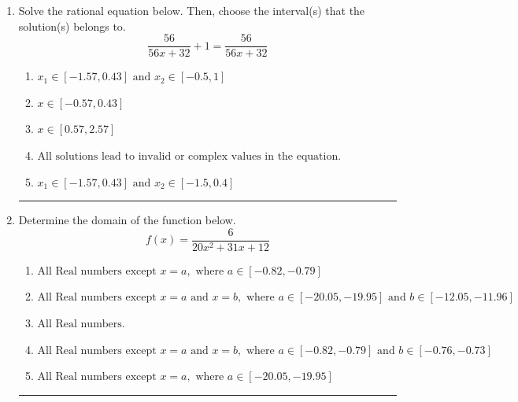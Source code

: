 \documentclass[14pt]{extbook}
\newcommand{\litem}[1]{\item#1\hspace*{-1cm}\rule{\textwidth}{0.4pt}}
\begin{document}
\begin{enumerate}
{\begin{enumerate}[label=\Alph*.]
\end{enumerate} }
\litem{
Solve the rational equation below. Then, choose the interval(s) that the solution(s) belongs to.\[ \frac{56}{56x + 32} + 1 = \frac{56}{56x + 32} \]\begin{enumerate}[label=\Alph*.]
\item \( x_1 \in [-1.57, 0.43] \text{ and } x_2 \in [-0.5,1] \)
\item \( x \in [-0.57,0.43] \)
\item \( x \in [0.57,2.57] \)
\item \( \text{All solutions lead to invalid or complex values in the equation.} \)
\item \( x_1 \in [-1.57, 0.43] \text{ and } x_2 \in [-1.5,0.4] \)

\end{enumerate} }
\litem{
Determine the domain of the function below.\[ f(x) = \frac{6}{20x^{2} +31 x + 12} \]\begin{enumerate}[label=\Alph*.]
\item \( \text{All Real numbers except } x = a, \text{ where } a \in [-0.82, -0.79] \)
\item \( \text{All Real numbers except } x = a \text{ and } x = b, \text{ where } a \in [-20.05, -19.95] \text{ and } b \in [-12.05, -11.96] \)
\item \( \text{All Real numbers.} \)
\item \( \text{All Real numbers except } x = a \text{ and } x = b, \text{ where } a \in [-0.82, -0.79] \text{ and } b \in [-0.76, -0.73] \)
\item \( \text{All Real numbers except } x = a, \text{ where } a \in [-20.05, -19.95] \)


\end{enumerate}}
\end{enumerate}
\end{document}
